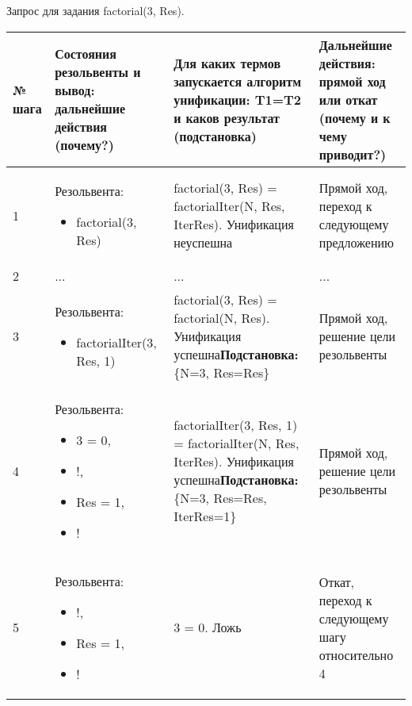 \documentclass[14pt,a4paper]{scrreprt}
\begin{document}
Запрос для задания factorial(3, Res).
\begin{table}[H]
	\begin{tabular}{|p{0.8cm\small}|p{4.7cm\small}|p{5.7cm\small}|p{4cm\small}|}	
		\hline
		№ шага & Состояния резольвенты и вывод: дальнейшие действия (почему?) & Для каких термов запускается алгоритм унификации: T1=T2 и каков результат (подстановка) & Дальнейшие действия: прямой ход или откат (почему и к чему приводит?)\\
		\hline
		1 & Резольвента:\begin{itemize} \item factorial(3, Res)  \end{itemize} & factorial(3, Res) = factorialIter(N, Res, IterRes). Унификация неуспешна & Прямой ход, переход к следующему предложению \\
		\hline
		2 & ... & ... & ...\\
		\hline
		3 & Резольвента:\begin{itemize} \item factorialIter(3, Res, 1) \end{itemize} & factorial(3, Res) = factorial(N, Res). Унификация успешна\linebreak \textbf{Подстановка:} \{N=3, Res=Res\} & Прямой ход, решение цели резольвенты \\
		\hline
		4 & Резольвента:\begin{itemize} \item  3 = 0, \item !, \item Res = 1, \item ! \end{itemize} & factorialIter(3, Res, 1) = factorialIter(N, Res, IterRes). Унификация успешна\linebreak \textbf{Подстановка:} \{N=3, Res=Res, IterRes=1\} & Прямой ход, решение цели резольвенты\\
		\hline
		5 & Резольвента:\begin{itemize} \item !, \item Res = 1, \item ! \end{itemize} & 3 = 0. Ложь & Откат, переход к следующему шагу относительно 4\\
		\hline
	\end{tabular}
\end{table}
\end{document}
